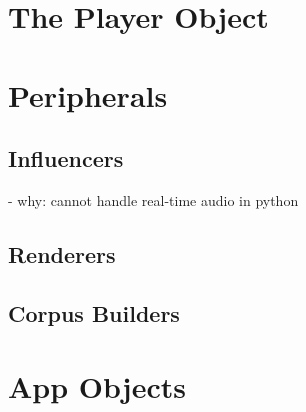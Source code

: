 

\section{The Player Object}\label{ssec:3-player}



\section{Peripherals}\label{ssec:3-peripherals}


\subsection{Influencers}\label{ssec:3-influencers}
- why: cannot handle real-time audio in python


\subsection{Renderers}\label{ssec:3-renderers}


\subsection{Corpus Builders}\label{ssec:3-corpusbuilders}


\section{App Objects}\label{ssec:3-app-objects}
